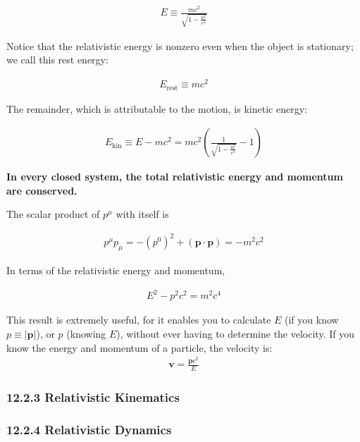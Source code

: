 \documentclass[12pt]{book}
\newcommand{\bm}[1]{\boldsymbol{#1}}
\begin{document}
        \begin{align}
        E \equiv \frac{mc^2}{\sqrt{1 - \frac{u^2}{c^2}}}
        \end{align}
        
        Notice that the relativistic energy is nonzero even when the object is stationary; we call this rest energy:
        
        \begin{align}
        E_\text{rest} \equiv mc^2
        \end{align}
        
        The remainder, which is attributable to the motion, is kinetic energy:
        
        \begin{align}
        E_\text{kin} \equiv E - mc^2 = mc^2 \left(\frac{1}{\sqrt{1 - \frac{u^2}{c^2}}} - 1\right)
        \end{align}

        \begin{center}
            \textbf{In every closed system, the total relativistic energy and momentum are conserved.}
        \end{center}
        
        The scalar product of \( p^\mu \) with itself is
        
        \begin{align}
        p^\mu p_\mu = -(p^0)^2 + (\bm{p} \cdot \bm{p}) = -m^2c^2
        \end{align}
        
        In terms of the relativistic energy and momentum,
        
        \begin{align}
        E^2 - p^2c^2 = m^2c^4 
        \end{align}
        
        This result is extremely useful, for it enables you to calculate \(E\) (if you know \( p \equiv |\bm{p}| \)), or \( p \) (knowing \( E \)), without ever having to determine the velocity. If you know the energy and momentum of a particle, the velocity is: 
        \begin{align}
        \bm{v}=\frac{\bm{p}c^2}{E}
        \end{align}
        
    \subsubsection{12.2.3 Relativistic Kinematics}
    \subsubsection{12.2.4 Relativistic Dynamics}
\end{document}
